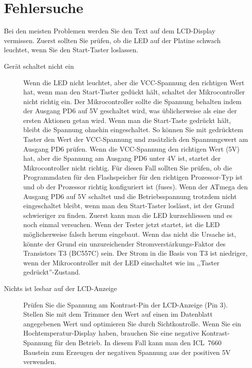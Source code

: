 \section{Fehlersuche}
Bei den meisten Problemen werden Sie den Text auf dem LCD-Display vermissen.
Zuerst sollten Sie prüfen, ob die LED auf der Platine schwach leuchtet, wenn Sie den Start-Taster
loslassen.
\begin{description}

\item[Gerät schaltet nicht ein]  
Wenn die LED nicht leuchtet, aber die VCC-Spannung den richtigen Wert hat, wenn
man den Start-Taster gedückt hält, schaltet der Mikrocontroller nicht richtig ein.
Der Mikrocontroller sollte die Spannung behalten indem der Ausgang PD6 auf 5V
geschaltet wird, was üblicherweise als eine der ersten Aktionen getan wird.
Wenn man die Start-Taste gedrückt hält, bleibt die Spannung ohnehin eingeschaltet.
So können Sie mit gedrücktem Taster den Wert der VCC-Spannung und zusätzlich den Spannungswert am
Ausgang PD6 prüfen.
Wenn die VCC-Spannung den richtigen Wert (5V) hat, aber die Spannung am Ausgang
PD6 unter 4V ist, startet der Mikrocontroller nicht richtig.
Für diesen Fall sollten Sie prüfen, ob die Programmdaten für den Flashspeicher
für den richtigen Prozessor-Typ ist und ob der Prozessor richtig konfiguriert ist (fuses).
Wenn der ATmega den Ausgang PD6 auf 5V schaltet und die Betriebsspannung 
trotzdem nicht eingeschaltet bleibt, wenn man den Start-Taster loslässt, ist der
Grund schwieriger zu finden.
Zuerst kann man die LED kurzschliessen und es noch einmal versuchen.
Wenn der Tester jetzt startet, ist die LED möglicherweise falsch herum eingebaut.
Wenn das nicht die Ursache ist, könnte der Grund ein unzureichender Stromverstärkungs-Faktor
des Transistors T3 (BC557C) sein.
Der Strom in die Basis von T3 ist niedriger, wenn der Mikrocontroller mit der LED einschaltet
wie im ,,Taster gedrückt''-Zustand.

\item[Nichts ist lesbar auf der LCD-Anzeige] 
Prüfen Sie die Spannung am Kontrast-Pin der LCD-Anzeige (Pin 3).
Stellen Sie mit dem Trimmer den Wert auf einen im Datenblatt angegebenen Wert und optimieren Sie
durch Sichtkontrolle.
Wenn Sie ein Hochtemperatur-Display haben, brauchen Sie eine negative Kontrast-Spannung für
den Betrieb.
In diesem Fall kann man den ICL~7660 Baustein zum Erzeugen der negativen Spannung aus der
positiven 5V verwenden.


\end{description}
